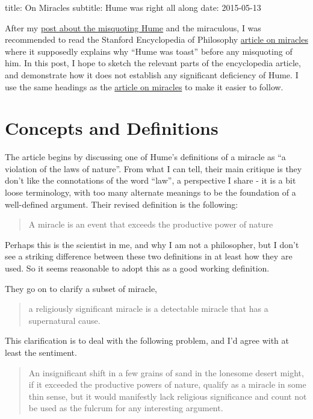 title: On Miracles subtitle: Hume was right all along date: 2015-05-13

After my \href{http://web.bryant.edu/~bblais/misquoting-hume.html}{post
about the misquoting Hume} and the miraculous, I was recommended to read
the Stanford Encyclopedia of Philosophy
\href{http://plato.stanford.edu/entries/miracles/}{article on miracles}
where it supposedly explains why ``Hume was toast'' before any
misquoting of him. In this post, I hope to sketch the relevant parts of
the encyclopedia article, and demonstrate how it does not establish any
significant deficiency of Hume. I use the same headings as the
\href{http://plato.stanford.edu/entries/miracles/}{article on miracles}
to make it easier to follow.

\section{Concepts and Definitions}\label{concepts-and-definitions}

The article begins by discussing one of Hume's definitions of a miracle
as ``a violation of the laws of nature''. From what I can tell, their
main critique is they don't like the connotations of the word ``law'', a
perspective I share - it is a bit loose terminology, with too many
alternate meanings to be the foundation of a well-defined argument.
Their revised definition is the following:

\begin{quote}
A miracle is an event that exceeds the productive power of nature
\end{quote}

Perhaps this is the scientist in me, and why I am not a philosopher, but
I don't see a striking difference between these two definitions in at
least how they are used. So it seems reasonable to adopt this as a good
working definition.

They go on to clarify a subset of miracle,

\begin{quote}
a religiously significant miracle is a detectable miracle that has a
supernatural cause.
\end{quote}

This clarification is to deal with the following problem, and I'd agree
with at least the sentiment.

\begin{quote}
An insignificant shift in a few grains of sand in the lonesome desert
might, if it exceeded the productive powers of nature, qualify as a
miracle in some thin sense, but it would manifestly lack religious
significance and count not be used as the fulcrum for any interesting
argument.
\end{quote}


